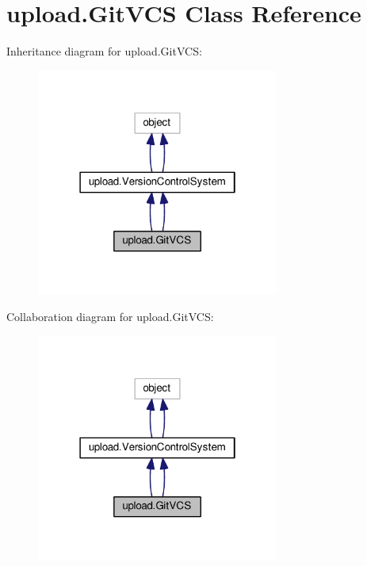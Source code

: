 \hypertarget{classupload_1_1GitVCS}{}\section{upload.\+Git\+V\+CS Class Reference}
\label{classupload_1_1GitVCS}


Inheritance diagram for upload.\+Git\+V\+CS\+:\nopagebreak
\begin{figure}[H]
\begin{center}
\leavevmode
\includegraphics[width=226pt]{classupload_1_1GitVCS__inherit__graph}
\end{center}
\end{figure}


Collaboration diagram for upload.\+Git\+V\+CS\+:\nopagebreak
\begin{figure}[H]
\begin{center}
\leavevmode
\includegraphics[width=226pt]{classupload_1_1GitVCS__coll__graph}
\end{center}
\end{figure}
